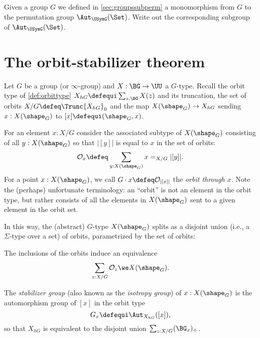 \begin{xca}
    Given a group $G$ we defined in \cref{sec:groupssubperm} a monomorphism from $G$ to the permutation group $\Aut_{\USymG}(\Set)$. Write out the corresponding subgroup of $\Aut_{\USymG}(\Set)$.
  \end{xca}
  
    

\section{The orbit-stabilizer theorem}
\label{sec:orbit-stabilizer-theorem}


Let $G$ be a group (or $\infty$-group) and  $X : \BG \to \UU$  a $G$-type.
Recall the orbit type of \cref{def:orbittype} $X_{hG}\defequi
\sum_{z:\BG}X(z)$ and its truncation, the set of orbits $X / G \defeq \Trunc{X_{hG}}_0$ and the map $X(\shape_G)\to X_{hG}$ sending $x:X(\shape_G)$ to $[x]\defequi (\shape_G,x)$.


For an element $x:X/G$ consider the associated subtype of $X(\shape_G)$ consisting of
 all $y : X(\shape_G)$ so that $|[y]|$ is equal to $x$ in the set of orbits:
\[
  \mathcal O_{x} \defeq \sum_{y : X(\shape_G)} x =_{X/G} |[y]|.
\]
 For a point $x : X(\shape_G)$, we call $G\cdot x \defeq \mathcal O_{|[x]|}$ 
 the \emph{orbit through $x$}.
Note the (perhaps) unfortunate terminology: an ``orbit'' is not an element in the
orbit type, but rather consists of all the elements in $X(\shape_G)$ sent to a given element in the orbit set.

In this way, the (abstract) $G$-type $X(\shape_G)$ splits as a disjoint union (i.e., a $\Sigma$-type over a set) of orbits,
parametrized by the set of orbits:
\begin{lemma}
  \label{lem:splitting into orbits}
  The inclusions of the orbits induce an equivalence 
\[
  \sum_{z : X / G} \mathcal O_z  \we X(\shape_G).
\]
\end{lemma}

The \emph{stabilizer group}
(also known as the \emph{isotropy group}) of
$x : X(\shape_G)$ is the automorphism group of $[x]$ in the orbit type
$$G_x\defequi\Aut_{X_{hG}}([x]),$$
so that
$X_{hG}$ is equivalent to the disjoint union $\sum_{z:X/G}(\BG_x)_\div$.

